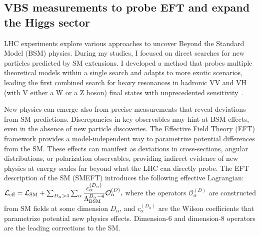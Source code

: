 {\begin{flushleft}
\vskip 4pt
\section{VBS measurements to probe EFT and expand the Higgs sector}
LHC experiments explore various approaches to uncover Beyond the Standard Model (BSM) physics. During my studies, I focused on direct searches for new particles predicted by SM extensions. I developed a method that probes multiple theoretical models within a single search and adapts to more exotic scenarios, leading the first combined search for heavy resonances in hadronic VV and VH (with V either a W or a Z boson) final states with unprecedented sensitivity~\cite{[1]}. %

New physics can emerge also from precise measurements that reveal deviations from SM predictions. Discrepancies in key observables may hint at BSM effects, even in the absence of new particle discoveries. The Effective Field Theory (EFT) framework provides a model-independent way to parametrize potential differences from the SM. These effects can manifest as deviations in cross-sections, angular distributions, or polarization observables, providing indirect evidence of new physics at energy scales far beyond what the LHC can directly probe.
The EFT description of the SM (SMEFT) introduces the following effective Lagrangian:
\begin{math}
    \mathcal{L}_{\text{eff}} = \mathcal{L}_{\text{SM}} + \sum_{D_\alpha>4}\sum_{\alpha}\dfrac{c_\alpha^{(D_\alpha)}}{\Lambda_{\text{BSM}}^{D_\alpha-4}}\mathcal{O}^{(D)}_\alpha \space,
\end{math}
where the operators $\mathcal{O}_\alpha^{(D)}$ are constructed from SM fields at some dimension $D_\alpha$, and $c_\alpha^{(D_\alpha)}$ are the Wilson coefficients that parametrize potential new physics effects. Dimension-6 and dimension-8 operators are the leading corrections to the SM.


\end{flushleft}}
